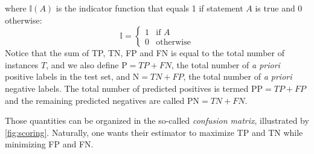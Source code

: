 %
where \(\mathbb{I}(A)\) is the indicator function that equals 1 if statement \(A\) is true and 0 otherwise:
%
\begin{equation} %
    \mathbb{I} = \begin{cases}
        1 & \text{if } A\\
        0 & \text{otherwise}
    \end{cases}
    \label{eq:indicator}
\end{equation}
%
Notice that the sum of TP, TN, FP and FN is equal to the total number of instances $T$, and we also define $\text{P}=TP+FN$, the total number of \textit{a priori} positive labels in the test set, and $\text{N}=TN+FP$, the total number of \textit{a priori} negative labels. The total number of predicted positives is termed $\text{PP}=TP+FP$ and the remaining predicted negatives are called $\text{PN}=TN+FN$.%


Those quantities can be organized in the so-called \emph{confusion matrix}, illustrated by \autoref{fig:scoring}.
%
Naturally, one wants their estimator to maximize TP and TN while minimizing FP and FN.

